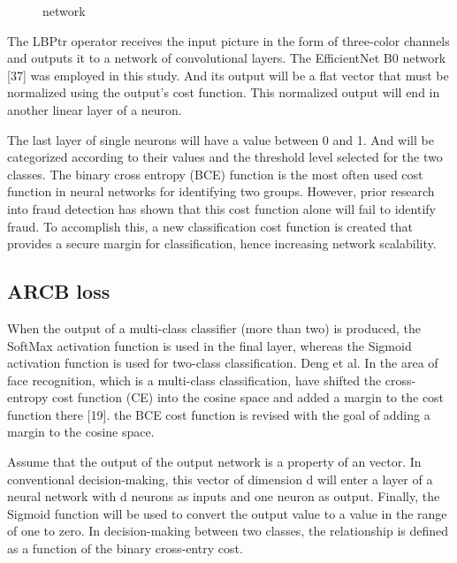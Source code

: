 \documentclass[journal]{IEEEtran}
\begin{document}
\begin{figure}[!ht]
	\caption{network}
	\label{fig:model}
\end{figure} 

The LBPtr operator receives the input picture in the form of three-color channels and outputs it to a network of convolutional layers. The EfficientNet B0 network [37] was employed in this study. And its output will be a flat vector that must be normalized using the output's cost function. This normalized output will end in another linear layer of a neuron.

The last layer of single neurons will have a value between 0 and 1. And will be categorized according to their values and the threshold level selected for the two classes.
The binary cross entropy (BCE) function is the most often used cost function in neural networks for identifying two groups. However, prior research into fraud detection has shown that this cost function alone will fail to identify fraud.
To accomplish this, a new classification cost function is created that provides a secure margin for classification, hence increasing network scalability.



\subsection{ARCB loss}
When the output of a multi-class classifier (more than two) is produced, the SoftMax activation function is used in the final layer, whereas the Sigmoid activation function is used for two-class classification.
Deng et al. In the area of face recognition, which is a multi-class classification, have shifted the cross-entropy cost function (CE) into the cosine space and added a margin to the cost function there [19]. the BCE cost function is revised with the goal of adding a margin to the cosine space.


Assume that the output of the output network is a property of an  vector. In conventional decision-making, this vector of dimension d will enter a layer of a neural network with d neurons as inputs and one neuron as output. Finally, the Sigmoid function will be used to convert the output value to a value in the range of one to zero.
In decision-making between two classes, the relationship is defined as a function of the binary cross-entry cost.
\end{document}

